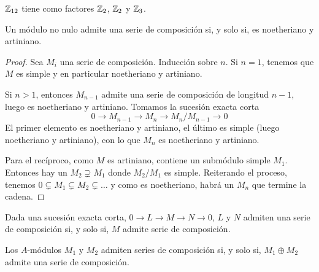 \(\mathbb{Z}_{12}\) tiene como factores \(\mathbb{Z}_2\), \(\mathbb{Z}_2\) y \(\mathbb{Z}_3\).

\begin{prop}
  Un módulo no nulo admite una serie de composición si, y solo si, es
  noetheriano y artiniano.
\end{prop}
\begin{proof}
  Sea \(M_i\) una serie de composición. Inducción sobre \(n\).
  Si \(n=1\), tenemos que \(M\) es simple y en particular noetheriano
  y artiniano.

  Si \(n>1\), entonces \(M_{n-1}\) admite una serie de composición de
  longitud \(n-1\), luego es noetheriano y artiniano. Tomamos
  la sucesión exacta corta \[0\longrightarrow M_{n-1}
  \longrightarrow M_n\longrightarrow M_n/M_{n-1}\longrightarrow 0\]
  El primer elemento es noetheriano y artiniano, el último es simple (luego
  noetheriano y artiniano), con lo que \(M_n\) es noetheriano y artiniano.

  Para el recíproco, como \(M\) es artiniano, contiene un submódulo
  simple \(M_1\). Entonces hay un \(M_2\supsetneq M_1\) donde
  \(M_2/M_1\) es simple. Reiterando el proceso, tenemos
  \(0\subsetneq M_1\subsetneq M_2\subsetneq \ldots\) y como es
  noetheriano, habrá un \(M_n\) que termine la cadena.
\end{proof}

\begin{cor}
  Dada una sucesión exacta corta, \(0\longrightarrow L
  \longrightarrow M\longrightarrow N\longrightarrow 0\),
  \(L\) y \(N\) admiten una serie de composición si, y solo si,
  \(M\) admite serie de composición.
\end{cor}

\begin{cor}
  Los \(A\)-módulos \(M_1\) y \(M_2\) admiten series de composición si, y solo si,
  \(M_1\oplus M_2\) admite una serie de composición.
\end{cor}


